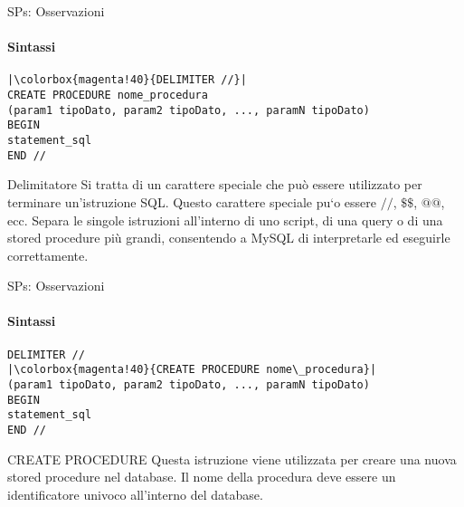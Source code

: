 \begin{frame}[fragile]{SPs: Osservazioni}
\framesubtitle{Sintassi}
\vspace{-.8cm}
\begin{lstlisting}
|\colorbox{magenta!40}{DELIMITER //}|
CREATE PROCEDURE nome_procedura
(param1 tipoDato, param2 tipoDato, ..., paramN tipoDato)
BEGIN
statement_sql
END //
\end{lstlisting}
\begin{minipage}{\textwidth}
    \begin{block}{Delimitatore}
    Si tratta di un carattere speciale che pu\`o essere utilizzato per terminare un'istruzione SQL.
    Questo carattere speciale pu`o essere $//$, $\$\$$, $@@$, ecc.
    Separa le singole istruzioni all'interno di uno script, di una query o di una stored procedure pi\`u grandi, consentendo a MySQL di interpretarle ed eseguirle correttamente.
    \end{block}
    \end{minipage}
\end{frame}
%
\begin{frame}[fragile]{SPs: Osservazioni}
\framesubtitle{Sintassi}
\vspace{-.8cm}
\begin{lstlisting}
DELIMITER //
|\colorbox{magenta!40}{CREATE PROCEDURE nome\_procedura}|
(param1 tipoDato, param2 tipoDato, ..., paramN tipoDato)
BEGIN
statement_sql
END //
\end{lstlisting}
\begin{minipage}{\textwidth}
    \begin{block}{CREATE PROCEDURE}
    Questa istruzione viene utilizzata per creare una nuova stored procedure nel database.
    Il nome della procedura deve essere un identificatore univoco all'interno del database.
    \end{block}
    \end{minipage}
\end{frame}
%
